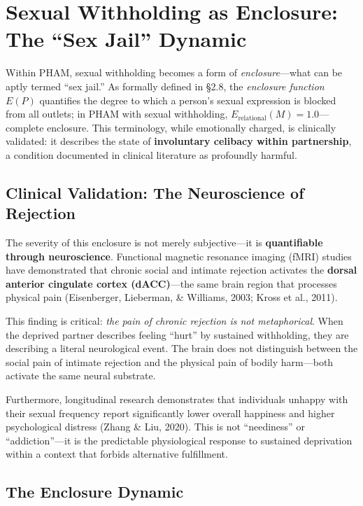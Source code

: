 \documentclass[12pt,openany]{book}
\numberwithin{equation}{chapter}
\begin{document}
\section{Sexual Withholding as Enclosure: The ``Sex Jail'' Dynamic}

Within PHAM, sexual withholding becomes a form of \textit{enclosure}---what can be aptly termed ``sex jail.'' As formally defined in \S 2.8, the \textit{enclosure function} $E(P)$ quantifies the degree to which a person's sexual expression is blocked from all outlets; in PHAM with sexual withholding, $E_{\text{relational}}(M) = 1.0$---complete enclosure. This terminology, while emotionally charged, is clinically validated: it describes the state of \textbf{involuntary celibacy within partnership}, a condition documented in clinical literature as profoundly harmful.

\subsection{Clinical Validation: The Neuroscience of Rejection}

The severity of this enclosure is not merely subjective---it is \textbf{quantifiable through neuroscience}. Functional magnetic resonance imaging (fMRI) studies have demonstrated that chronic social and intimate rejection activates the \textbf{dorsal anterior cingulate cortex (dACC)}---the same brain region that processes physical pain (Eisenberger, Lieberman, \& Williams, 2003; Kross et al., 2011).

This finding is critical: \textit{the pain of chronic rejection is not metaphorical}. When the deprived partner describes feeling ``hurt'' by sustained withholding, they are describing a literal neurological event. The brain does not distinguish between the social pain of intimate rejection and the physical pain of bodily harm---both activate the same neural substrate.

Furthermore, longitudinal research demonstrates that individuals unhappy with their sexual frequency report significantly lower overall happiness and higher psychological distress (Zhang \& Liu, 2020). This is not ``neediness'' or ``addiction''---it is the predictable physiological response to sustained deprivation within a context that forbids alternative fulfillment.

\subsection{The Enclosure Dynamic}
\end{document}
